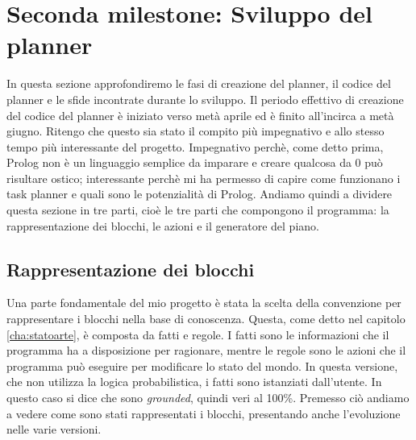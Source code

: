\section{Seconda milestone: Sviluppo del planner}
\label{sec:sviluppoplanner}
In questa sezione approfondiremo le fasi di creazione del planner, il codice del planner e le sfide incontrate durante lo sviluppo.
Il periodo effettivo di creazione del codice del planner è iniziato verso metà aprile ed è finito all'incirca a metà giugno. Ritengo che questo sia stato il compito più impegnativo e allo stesso tempo più interessante del progetto.
Impegnativo perchè, come detto prima, Prolog non è un linguaggio semplice da imparare e creare qualcosa da 0 può risultare ostico; interessante perchè mi ha permesso di capire come funzionano i task planner e quali sono le potenzialità di Prolog.
Andiamo quindi a dividere questa sezione in tre parti, cioè le tre parti che compongono il programma: la rappresentazione dei blocchi, le azioni e il generatore del piano.

\subsection{Rappresentazione dei blocchi}
\label{subsec:rapprblocchi}
Una parte fondamentale del mio progetto è stata la scelta della convenzione per rappresentare i blocchi nella base di conoscenza. Questa, come detto nel capitolo \ref{cha:statoarte}, è composta da fatti e regole. I fatti sono le informazioni che il programma ha a disposizione per ragionare, mentre le regole sono le azioni che il programma può eseguire per modificare lo stato del mondo.
In questa versione, che non utilizza la logica probabilistica, i fatti sono istanziati dall'utente. In questo caso si dice che sono \textit{grounded}, quindi veri al 100\%.
Premesso ciò andiamo a vedere come sono stati rappresentati i blocchi, presentando anche l'evoluzione nelle varie versioni.

